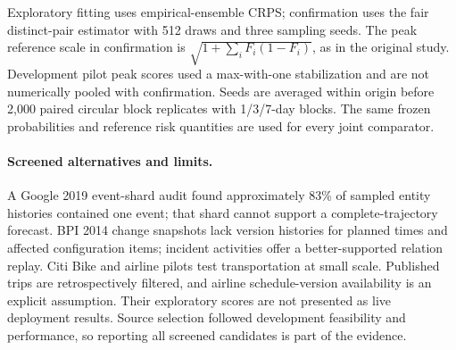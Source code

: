 Exploratory fitting uses empirical-ensemble CRPS; confirmation uses the fair
distinct-pair estimator with 512 draws and three sampling seeds. The peak
reference scale in confirmation is $\sqrt{1+\sum_iF_i(1-F_i)}$, as in the
original study. Development pilot peak scores used a max-with-one stabilization
and are not numerically pooled with confirmation. Seeds are averaged within
origin before 2,000 paired circular block replicates with 1/3/7-day blocks.
The same frozen probabilities and reference risk quantities are used for
every joint comparator.

\paragraph{Screened alternatives and limits.}
A Google 2019 \citep{google2019} event-shard audit found approximately 83\% of
sampled entity histories contained one event; that shard cannot support a
complete-trajectory forecast. BPI 2014 change snapshots lack version histories
for planned times and affected configuration items; incident activities offer
a better-supported relation replay. Citi Bike \citep{citibike} and airline
\citep{bts2024} pilots test transportation at small scale. Published trips are
retrospectively filtered, and airline schedule-version availability is an
explicit assumption. Their exploratory scores are not presented as live
deployment results. Source selection followed development feasibility and
performance, so reporting all screened candidates is part of the evidence.

